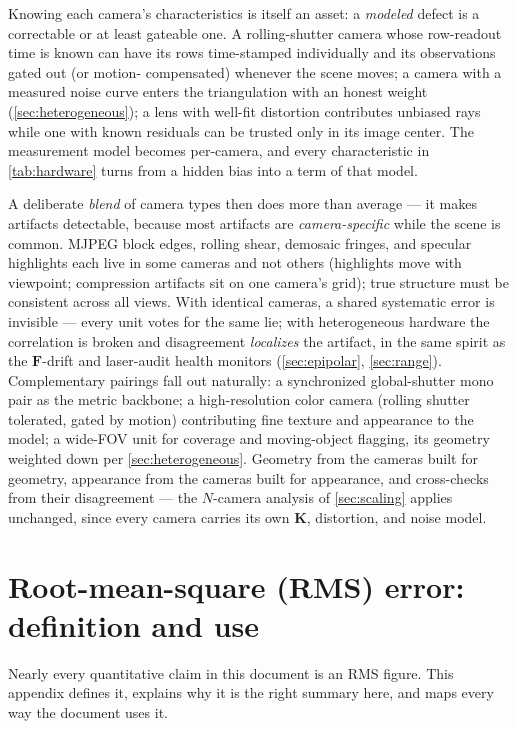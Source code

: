 \documentclass[11pt]{article}
\theoremstyle{definition}
\newcommand{\mat}[1]{\mathbf{#1}}
\newcommand{\K}{\mat{K}}
\newcommand{\F}{\mat{F}}
\begin{document}
Knowing each camera's characteristics is itself an asset: a
\emph{modeled} defect is a correctable or at least gateable one. A
rolling-shutter camera whose row-readout time is known can have its rows
time-stamped individually and its observations gated out (or motion-
compensated) whenever the scene moves; a camera with a measured noise
curve enters the triangulation with an honest weight
(\autoref{sec:heterogeneous}); a lens with well-fit distortion
contributes unbiased rays while one with known residuals can be trusted
only in its image center. The measurement model becomes per-camera, and
every characteristic in \autoref{tab:hardware} turns from a hidden bias
into a term of that model.

A deliberate \emph{blend} of camera types then does more than average ---
it makes artifacts detectable, because most artifacts are
\emph{camera-specific} while the scene is common. MJPEG block edges,
rolling shear, demosaic fringes, and specular highlights each live in
some cameras and not others (highlights move with viewpoint; compression
artifacts sit on one camera's grid); true structure must be consistent
across all views. With identical cameras, a shared systematic error is
invisible --- every unit votes for the same lie; with heterogeneous
hardware the correlation is broken and disagreement \emph{localizes} the
artifact, in the same spirit as the $\F$-drift and laser-audit health
monitors (\autoref{sec:epipolar}, \autoref{sec:range}). Complementary
pairings fall out naturally: a synchronized global-shutter mono pair as
the metric backbone; a high-resolution color camera (rolling shutter
tolerated, gated by motion) contributing fine texture and appearance to
the model; a wide-FOV unit for coverage and moving-object flagging, its
geometry weighted down per \autoref{sec:heterogeneous}. Geometry from
the cameras built for geometry, appearance from the cameras built for
appearance, and cross-checks from their disagreement --- the
$N$-camera analysis of \autoref{sec:scaling} applies unchanged, since
every camera carries its own $\K$, distortion, and noise model.

\section{Root-mean-square (RMS) error: definition and use}
\label{sec:rms}

Nearly every quantitative claim in this document is an RMS figure. This
appendix defines it, explains why it is the right summary here, and maps
every way the document uses it.
\end{document}
